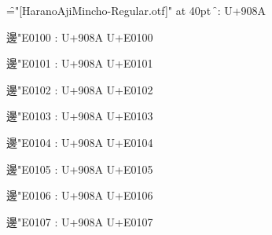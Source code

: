
\nopagenumbers

\font\f="[HaranoAjiMincho-Regular.otf]" at 40pt \f

邊: U+908A\par
邊\char"E0100 : U+908A U+E0100\par
邊\char"E0101 : U+908A U+E0101\par
邊\char"E0102 : U+908A U+E0102\par
邊\char"E0103 : U+908A U+E0103\par
邊\char"E0104 : U+908A U+E0104\par
邊\char"E0105 : U+908A U+E0105\par
邊\char"E0106 : U+908A U+E0106\par
邊\char"E0107 : U+908A U+E0107\par

\bye
